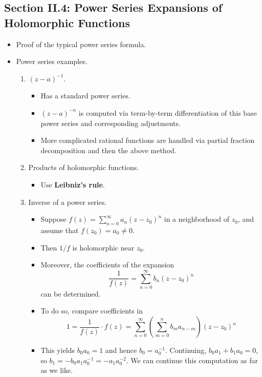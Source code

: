 \documentclass[../notes.tex]{subfiles}
\begin{document}
\subsection*{Section II.4: Power Series Expansions of Holomorphic Functions}
\begin{itemize}
    \item Proof of the typical power series formula.
    \item Power series examples.
    \begin{enumerate}
        \item $(z-a)^{-1}$.
        \begin{itemize}
            \item Has a standard power series.
            \item $(z-a)^{-n}$ is computed via term-by-term differentiation of this base power series and corresponding adjustments.
            \item More complicated rational functions are handled via partial fraction decomposition and then the above method.
        \end{itemize}
        \item Products of holomorphic functions.
        \begin{itemize}
            \item Use \textbf{Leibniz's rule}.
        \end{itemize}
        \item Inverse of a power series.
        \begin{itemize}
            \item Suppose $f(z)=\sum_{n=0}^\infty a_n(z-z_0)^n$ in a neighborhood of $z_0$, and assume that $f(z_0)=a_0\neq 0$.
            \item Then $1/f$ is holomorphic near $z_0$.
            \item Moreover, the coefficients of the expansion
            \begin{equation*}
                \frac{1}{f(z)} = \sum_{n=0}^\infty b_n(z-z_0)^n
            \end{equation*}
            can be determined.
            \item To do so, compare coefficients in
            \begin{equation*}
                1 = \frac{1}{f(z)}\cdot f(z)
                = \sum_{n=0}^\infty\left( \sum_{m=0}^nb_ma_{n-m} \right)(z-z_0)^n
            \end{equation*}
            \item This yields $b_0a_0=1$ and hence $b_0=a_0^{-1}$. Continuing, $b_0a_1+b_1a_0=0$, so $b_1=-b_0a_1a_0^{-1}=-a_1a_0^{-2}$. We can continue this computation as far as we like.

\end{itemize}
\end{enumerate}
\end{itemize}
\end{document}
